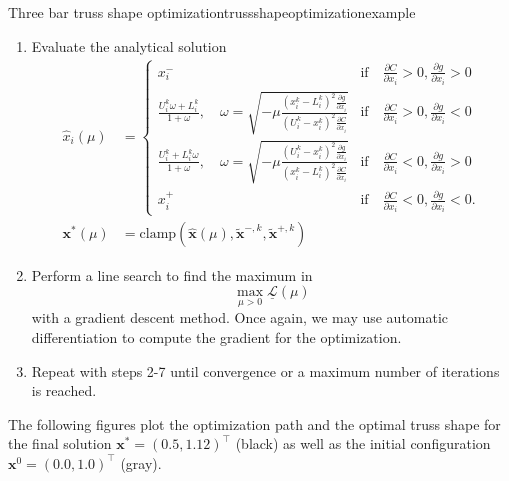 \begin{example}{Three bar truss shape optimization}{trussshapeoptimizationexample}
\begin{enumerate}
        \item Evaluate the analytical solution
            \begin{align}
                \hat{x}_i(\mu) &= 
                \begin{cases}
                    x^-_i 
                        &\textrm{if} \quad \frac{\partial C}{\partial x_i} > 0, \frac{\partial g}{\partial x_i} > 0 \\
                    \frac{U_i^k\omega + L_i^k}{1+\omega}, \quad \omega = \sqrt{-\mu\frac{(x_i^k-L_i^k)^2\frac{\partial g}{\partial x_i}}{(U_i^k-x_i^k)^2\frac{\partial C}{\partial x_i}}}
                        &\textrm{if} \quad \frac{\partial C}{\partial x_i}  > 0, \frac{\partial g}{\partial x_i} <0\\
                    \frac{U_i^k + L_i^k\omega}{1+\omega}, \quad \omega = \sqrt{-\mu\frac{(U_i^k-x_i^k)^2\frac{\partial g}{\partial x_i}}{(x_i^k-L_i^k)^2\frac{\partial C}{\partial x_i}}} 
                        &\textrm{if} \quad \frac{\partial C}{\partial x_i} < 0, \frac{\partial g}{\partial x_i}  > 0\\
                    x^+_i 
                        &\textrm{if} \quad \frac{\partial C}{\partial x_i}< 0, \frac{\partial g}{\partial x_i} < 0.
                \end{cases} \\
                \mathbf{x}^* (\mu) &= \textrm{clamp}\left(\hat{\mathbf{x}}(\mu), \tilde{\mathbf{x}}^{-,k}, \tilde{\mathbf{x}}^{+,k}\right)
            \end{align}
        \item Perform a line search to find the maximum in 
            \begin{equation}
                \max_{\mu>0} \underline{\mathcal{L}}(\mu)
            \end{equation}
            with a gradient descent method. Once again, we may use automatic differentiation to compute the gradient for the optimization.
        \item Repeat with steps 2-7 until convergence or a maximum number of iterations is reached.
    \end{enumerate}
    
    The following figures plot the optimization path and the optimal truss shape for the final solution $\mathbf{x}^* = (0.5, 1.12)^\top$ (black) as well as the initial configuration $\mathbf{x}^0 = (0.0, 1.0)^\top$ (gray).

    \begin{minipage}{.5\textwidth}
        \centering
        
    \end{minipage}%
    \begin{minipage}{.5\textwidth}
        \centering
        
    \end{minipage}
       
\end{example}


 





